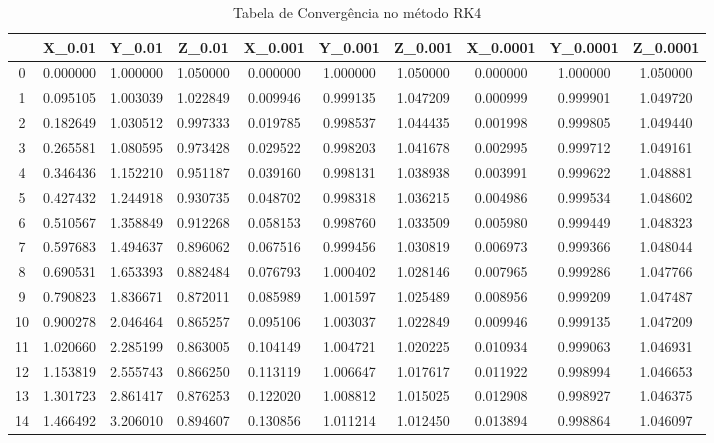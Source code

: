 \documentclass[12pt, a4paper]{article}
\begin{document}
\begin{table}[H]
\centering
\footnotesize %
    \begin{tabular}{|c|c|c|c|c|c|c|c|c|c|}
    \toprule
     & X_{0.01} & Y_{0.01} & Z_{0.01} & X_{0.001} & Y_{0.001} & Z_{0.001} & X_{0.0001} & Y_{0.0001} & Z_{0.0001} \\
    \midrule
    0 & 0.000000 & 1.000000 & 1.050000 & 0.000000 & 1.000000 & 1.050000 & 0.000000 & 1.000000 & 1.050000 \\
    1 & 0.095105 & 1.003039 & 1.022849 & 0.009946 & 0.999135 & 1.047209 & 0.000999 & 0.999901 & 1.049720 \\
    2 & 0.182649 & 1.030512 & 0.997333 & 0.019785 & 0.998537 & 1.044435 & 0.001998 & 0.999805 & 1.049440 \\
    3 & 0.265581 & 1.080595 & 0.973428 & 0.029522 & 0.998203 & 1.041678 & 0.002995 & 0.999712 & 1.049161 \\
    4 & 0.346436 & 1.152210 & 0.951187 & 0.039160 & 0.998131 & 1.038938 & 0.003991 & 0.999622 & 1.048881 \\
    5 & 0.427432 & 1.244918 & 0.930735 & 0.048702 & 0.998318 & 1.036215 & 0.004986 & 0.999534 & 1.048602 \\
    6 & 0.510567 & 1.358849 & 0.912268 & 0.058153 & 0.998760 & 1.033509 & 0.005980 & 0.999449 & 1.048323 \\
    7 & 0.597683 & 1.494637 & 0.896062 & 0.067516 & 0.999456 & 1.030819 & 0.006973 & 0.999366 & 1.048044 \\
    8 & 0.690531 & 1.653393 & 0.882484 & 0.076793 & 1.000402 & 1.028146 & 0.007965 & 0.999286 & 1.047766 \\
    9 & 0.790823 & 1.836671 & 0.872011 & 0.085989 & 1.001597 & 1.025489 & 0.008956 & 0.999209 & 1.047487 \\
    10 & 0.900278 & 2.046464 & 0.865257 & 0.095106 & 1.003037 & 1.022849 & 0.009946 & 0.999135 & 1.047209 \\
    11 & 1.020660 & 2.285199 & 0.863005 & 0.104149 & 1.004721 & 1.020225 & 0.010934 & 0.999063 & 1.046931 \\
    12 & 1.153819 & 2.555743 & 0.866250 & 0.113119 & 1.006647 & 1.017617 & 0.011922 & 0.998994 & 1.046653 \\
    13 & 1.301723 & 2.861417 & 0.876253 & 0.122020 & 1.008812 & 1.015025 & 0.012908 & 0.998927 & 1.046375 \\
    14 & 1.466492 & 3.206010 & 0.894607 & 0.130856 & 1.011214 & 1.012450 & 0.013894 & 0.998864 & 1.046097 \\
    \bottomrule
    \end{tabular}
    \caption{Tabela de Convergência no método RK4}
    \end{table}
\end{document}
